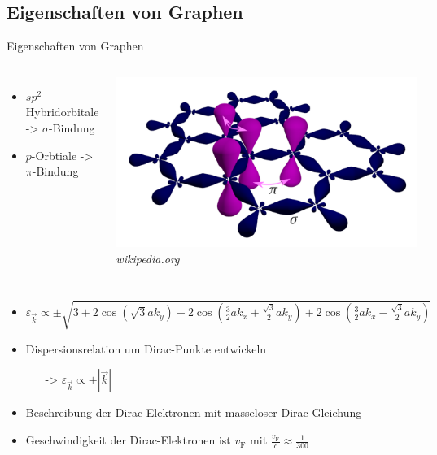\documentclass[aspectratio=1610, 9pt]{beamer}
\begin{document}
\subsection{Eigenschaften von Graphen}
\begin{frame}{Eigenschaften von Graphen}
\begin{columns}
  \begin{itemize}
      \item $sp^2$-Hybridorbitale -> $\sigma$-Bindung 
      \item $p$-Orbtiale -> $\pi$-Bindung
      \end{itemize}
  \centering
    \includegraphics[width=\textwidth]{Plots/orbitals.png}
    \hspace*{15pt}\hbox{\scriptsize {\small\itshape wikipedia.org}}
  \end{columns}
  \begin{columns}
  \pause 
  \begin{itemize}
    \vspace*{-2cm}
      \item 
      $\varepsilon_{\vec{k}} \propto \pm \sqrt{3+2 \cos \left ( \sqrt{3}ak_y \right )+2\cos \left ( \frac{3}{2}ak_x+\frac{\sqrt{3}}{2}ak_y \right ) + 2\cos \left ( \frac{3}{2}ak_x-\frac{\sqrt{3}}{2}ak_y \right ) }$
    \item Dispersionsrelation um Dirac-Punkte entwickeln
      \begin{itemize}
        \item[->] $\varepsilon_{\vec{k}} \propto \pm | \vec{k} |$
      \end{itemize}
    \item Beschreibung der Dirac-Elektronen mit masseloser Dirac-Gleichung
    \item Geschwindigkeit der Dirac-Elektronen ist $v_\text{F}$ mit $\frac{v_\text{F}}{c} \approx \frac{1}{300}$

\end{itemize}
\end{columns}
\end{frame}
\end{document}

